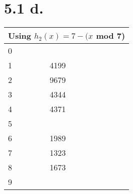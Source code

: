 \documentclass[12pt,letterpaper]{article}
\begin{document}
\section*{5.1 d.}
\begin{tabular}{|l|l|}
\hline
\multicolumn{2}{|c|}{Using $h_2(x)=7-(x$ mod 7)} \\
\hline
0 & \\
1 & 4199\\
2 & 9679\\
3 & 4344\\
4 & 4371\\
5 & \\
6 & 1989\\
7 & 1323\\
8 & 1673\\
9 & \\
\hline
\end{tabular}
\newpage
\end{document}
